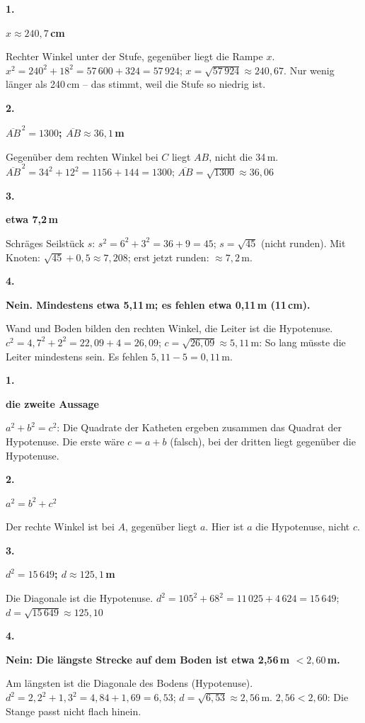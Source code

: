 \documentclass[11pt]{article}
\newcommand{\lsg}[3]{\par\noindent\begin{minipage}[t]{9mm}\textbf{#1}\end{minipage}%
  \begin{minipage}[t]{52mm}\raggedright\bfseries\boldmath #2\end{minipage}\hspace{3mm}%
  \begin{minipage}[t]{\dimexpr\linewidth-64mm\relax}\raggedright\small #3\end{minipage}\par\vspace{4pt}}
\begin{document}
\par\Needspace{25mm}\vspace{6pt}\noindent\colorbox{black!12}{}\hspace{2mm}{\bfseries Sachaufgaben: Leiter, Rampe, Gelände}\par\vspace{4pt}
\lsg{1.}{$x \approx 240{,}7$\,cm}{Rechter Winkel unter der Stufe, gegenüber liegt die Rampe $x$. $x^2 = 240^2 + 18^2 = 57\,600 + 324 = 57\,924$; $x = \sqrt{57\,924} \approx 240{,}67$. Nur wenig länger als 240\,cm – das stimmt, weil die Stufe so niedrig ist.}
\lsg{2.}{$\overline{AB}^{\,2} = 1300$; $\overline{AB} \approx 36{,}1$\,m}{Gegenüber dem rechten Winkel bei $C$ liegt $AB$, nicht die 34\,m. $\overline{AB}^{\,2} = 34^2 + 12^2 = 1156 + 144 = 1300$; $\overline{AB} = \sqrt{1300} \approx 36{,}06$}
\lsg{3.}{etwa 7,2\,m}{Schräges Seilstück $s$: $s^2 = 6^2 + 3^2 = 36 + 9 = 45$; $s = \sqrt{45}$ (nicht runden). Mit Knoten: $\sqrt{45} + 0{,}5 \approx 7{,}208$; erst jetzt runden: $\approx 7{,}2$\,m.}
\lsg{4.}{Nein. Mindestens etwa 5,11\,m; es fehlen etwa 0,11\,m (11\,cm).}{Wand und Boden bilden den rechten Winkel, die Leiter ist die Hypotenuse. $c^2 = 4{,}7^2 + 2^2 = 22{,}09 + 4 = 26{,}09$; $c = \sqrt{26{,}09} \approx 5{,}11$\,m: So lang müsste die Leiter mindestens sein. Es fehlen $5{,}11 - 5 = 0{,}11$\,m.}
\par\Needspace{25mm}\vspace{6pt}\noindent\colorbox{black!12}{}\hspace{2mm}{\bfseries Probetest}\par\vspace{4pt}
\lsg{1.}{die zweite Aussage}{$a^2 + b^2 = c^2$: Die Quadrate der Katheten ergeben zusammen das Quadrat der Hypotenuse. Die erste wäre $c = a + b$ (falsch), bei der dritten liegt gegenüber die Hypotenuse.}
\lsg{2.}{$a^2 = b^2 + c^2$}{Der rechte Winkel ist bei $A$, gegenüber liegt $a$. Hier ist $a$ die Hypotenuse, nicht $c$.}
\lsg{3.}{$d^2 = 15\,649$; $d \approx 125{,}1$\,m}{Die Diagonale ist die Hypotenuse. $d^2 = 105^2 + 68^2 = 11\,025 + 4\,624 = 15\,649$; $d = \sqrt{15\,649} \approx 125{,}10$}
\lsg{4.}{Nein: Die längste Strecke auf dem Boden ist etwa 2,56\,m $< 2{,}60$\,m.}{Am längsten ist die Diagonale des Bodens (Hypotenuse). $d^2 = 2{,}2^2 + 1{,}3^2 = 4{,}84 + 1{,}69 = 6{,}53$; $d = \sqrt{6{,}53} \approx 2{,}56$\,m. $2{,}56 < 2{,}60$: Die Stange passt nicht flach hinein.}
\end{document}
